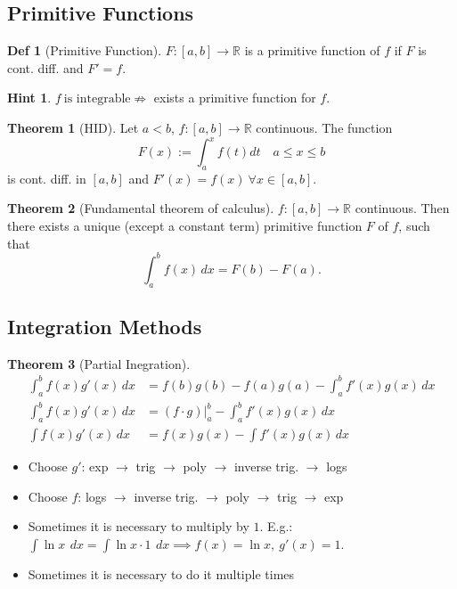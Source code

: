 \documentclass[a4paper, 10pt]{article}
\theoremstyle{definition}
\newtheorem*{definition}{Def}
\newtheorem*{note_wrapper}{Hint}
\theoremstyle{named}
\newtheorem*{ntheorem_wrapper}{Theorem}
\newenvironment{ntheorem}%
    {\begin{mdframed}[style=important]\begin{ntheorem_wrapper}}%
    {\end{ntheorem_wrapper}\end{mdframed}}
\newenvironment{note}%
    {\begin{mdframed}[style=trick]\begin{note_wrapper}}%
    {\end{note_wrapper}\end{mdframed}}
\newcommand{\R}{\mathbb{R}}
\begin{document}
\subsection{Primitive Functions}
\begin{definition}[Primitive Function]
    $F: [a, b] \to \R$ is a primitive function of $f$ if $F$ is cont. diff. and $F' = f$.
\end{definition}

\begin{note}
    $f \ \text{is integrable} \not\Rightarrow$ exists a primitive function for $f$.
\end{note}

\begin{ntheorem}[HID]
    Let $a < b$, $f: [a, b] \to \R$ continuous. The function 
    $$F(x) := \int_a^x f(t) dt \quad a \leq x \leq b$$
    is cont. diff. in $[a, b]$ and $F'(x) = f(x) \ \forall x \in [a, b]$.
\end{ntheorem}

\begin{ntheorem}[Fundamental theorem of calculus]
    $f: [a, b] \to \R$ continuous. Then there exists a unique (except a constant term) primitive function $F$ of $f$, such that 
    $$\int_a^b f(x) \,dx = F(b) - F(a).$$
\end{ntheorem}

\pagebreak
\subsection{Integration Methods}
\begin{ntheorem}[Partial Inegration]
    \begin{align*}
        \int_a^b f(x) g'(x) \,dx &= f(b)g(b) - f(a)g(a) - \int_a^b f'(x)g(x) \,dx \\
        \int_a^b f(x) g'(x) \,dx &= (f \cdot g)|_a^b - \int_a^b f'(x)g(x) \,dx \\
        \int f(x)g'(x) \,dx &= f(x) g(x) - \int f'(x) g(x) \,dx
    \end{align*}
\end{ntheorem}
\begin{itemize}
    \item Choose $g'$: exp $\rightarrow$ trig $\rightarrow$ poly $\rightarrow$ inverse trig. $\rightarrow$ logs
    \item Choose $f$: logs $\rightarrow$ inverse trig. $\rightarrow$ poly $\rightarrow$ trig $\rightarrow$ exp
    \item Sometimes it is necessary to multiply by $1$. E.g.: $\int \ln x \ \,dx = \int \ln x \cdot 1 \ \,dx \implies f(x) = \ln x, \ g'(x) = 1$.
    \item Sometimes it is necessary to do it multiple times
\end{itemize}
\end{document}
